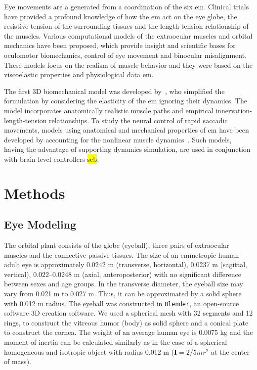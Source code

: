 \documentclass[11pt,a4paper,draft=false]{report}
\newcommand{\mat}[1]{\bm{#1}}
\begin{document}
Eye movements are a generated from a coordination of the six \gls{em}. Clinical
trials have provided a profound knowledge of how the \gls{em} act on the eye
globe, the resistive tension of the surrounding tissues and the length-tension
relationship of the muscles. Various computational models of the extraocular
muscles and orbital mechanics have been proposed, which provide insight and
scientific bases for oculomotor biomechanics, control of eye movement and
binocular misalignment. These models focus on the realism of muscle behavior and
they were based on the viscoelastic properties and physiological data \gls{em}.

The first 3D biomechanical model was developed by~\cite{Robinson1964a,
  Robinson1969}, who simplified the formulation by considering the elasticity of
the \gls{em} ignoring their dynamics. The model incorporates anatomically
realistic muscle paths and empirical innervation-length-tension
relationships. To study the neural control of rapid saccadic movements, models
using anatomical and mechanical properties of \gls{em} have been developed by
accounting for the nonlinear muscle dynamics~\cite{Thelen2003a,
  Millard2013}. Such models, having the advantage of supporting dynamics
simulation, are used in conjunction with brain level controllers \hl{seb}.

\section*{Methods}\label{sec:methods}

\subsection*{Eye Modeling}\label{sec:eye-Modeling}

The orbital plant consists of the globe (eyeball), three pairs of extraocular
muscles and the connective passive tissues. The size of an emmetropic human
adult eye is approximately 0.0242 m (transverse, horizontal), 0.0237 m
(sagittal, vertical), 0.022–0.0248 m (axial, anteroposterior) with no
significant difference between sexes and age groups. In the transverse diameter,
the eyeball size may vary from 0.021 m to 0.027 m. Thus, it can be approximated
by a solid sphere with 0.012 m radius. The eyeball was constructed in
\texttt{Blender}, an open-source software 3D creation software. We used a
spherical mesh with 32 segments and 12 rings, to construct the vitreous humor
(body) as solid sphere and a conical plate to construct the cornea. The weight
of an average human eye is 0.0075 kg and the moment of inertia can be calculated
similarly as in the case of a spherical homogeneous and isotropic object with
radius 0.012 m ($\mat{I} = 2/5 m r^2$ at the center of mass).
\end{document}
